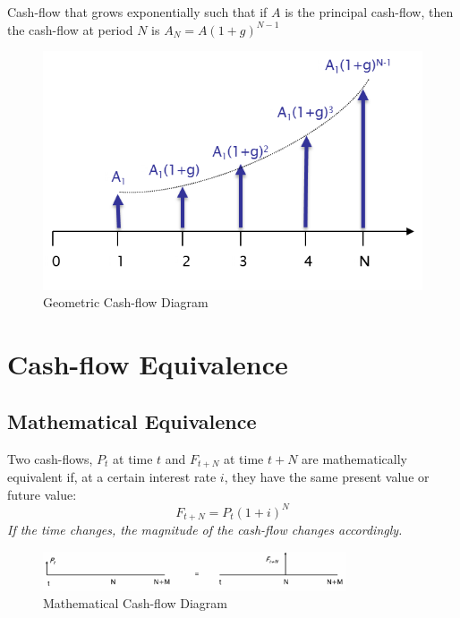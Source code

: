 \begin{definition}
    Cash-flow that grows exponentially such that if $A$ is the principal cash-flow, then the cash-flow at period $N$ is $A_N = A(1+g)^{N-1}$
\end{definition}

\begin{figure}[H]
    \centering
    \includegraphics{LECTURE_2/geometric-gradient-series.png}
    \caption{Geometric Cash-flow Diagram}
    \label{geom-cash-flow}
\end{figure}

\section{Cash-flow Equivalence}

\subsection{Mathematical Equivalence}
\begin{definition}
    Two cash-flows, $P_t$ at time $t$ and $F_{t+N}$ at time $t+N$ are mathematically equivalent if, at a certain interest rate $i$, they have the same present value or future value:
    \[
        F_{t+N} = P_t(1+i)^N
    \]
    \textit{If the time changes, the magnitude of the cash-flow changes accordingly.}
\end{definition}

\begin{figure}[H]
    \centering
    \includegraphics[width=0.8\textwidth]{LECTURE_2/mat-equiv.png}
    \caption{Mathematical Cash-flow Diagram}
    \label{fig:mathematical_cash-flow}
\end{figure}

